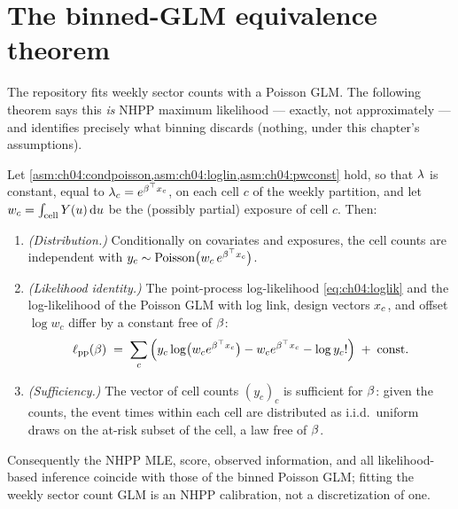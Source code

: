 \section{The binned-GLM equivalence theorem}\label{ch04:sec:glm}

The repository fits weekly sector counts with a Poisson GLM. The following
theorem says this \emph{is} NHPP maximum likelihood --- exactly, not
approximately --- and identifies precisely what binning discards
(nothing, under this chapter's assumptions).

\begin{theorem}[Piecewise-constant NHPP $=$ Poisson GLM with log-exposure offset]\label{thm:ch04:glmequiv}
Let \cref{asm:ch04:condpoisson,asm:ch04:loglin,asm:ch04:pwconst} hold, so
that $\lambda$ is constant, equal to $\lambda_c = e^{\beta^{\top}x_c}$, on each
cell $c$ of the weekly partition, and let $w_c = \int_{\text{cell}}
Y(u)\,\mathrm{d} u$ be the (possibly partial) exposure of cell $c$. Then:
\begin{enumerate}[label=(\roman*)]
\item \emph{(Distribution.)} Conditionally on covariates and exposures,
the cell counts are independent with
$y_c \sim \mathrm{Poisson}\big(w_c\, e^{\beta^{\top} x_c}\big)$.
\item \emph{(Likelihood identity.)} The point-process log-likelihood
\cref{eq:ch04:loglik} and the log-likelihood of the Poisson GLM with log
link, design vectors $x_c$, and offset $\log w_c$ differ by a constant
free of $\beta$:
\begin{equation}\label{eq:ch04:glm}
\ell_{\mathrm{pp}}(\beta)
 \;=\;
 \sum_c \Big( y_c \log\!\big(w_c e^{\beta^{\top}x_c}\big)
 - w_c e^{\beta^{\top}x_c} - \log y_c! \Big)
 \;+\; \text{const}.
\end{equation}
\item \emph{(Sufficiency.)} The vector of cell counts $(y_c)_c$ is
sufficient for $\beta$: given the counts, the event times within each
cell are distributed as i.i.d.\ uniform draws on the at-risk subset of the
cell, a law free of $\beta$.
\end{enumerate}
Consequently the NHPP MLE, score, observed information, and all
likelihood-based inference coincide with those of the binned Poisson GLM;
fitting the weekly sector count GLM is an NHPP calibration, not a
discretization of one.
\end{theorem}


